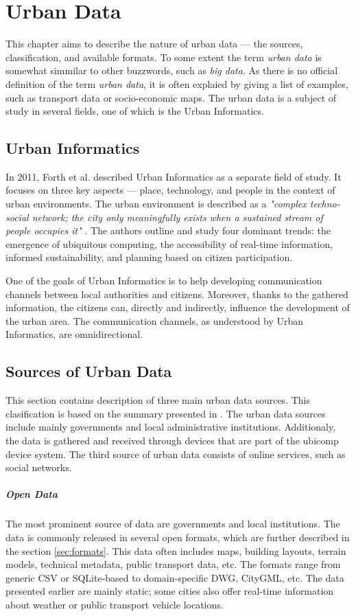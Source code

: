 \chapter{Urban Data}
This chapter aims to describe the nature of urban data --- the sources, classification, and available formats. To some extent the term \textit{urban data} is somewhat simmilar to other buzzwords, such as \textit{big data}. As there is no official definition of the term \textit{urban data}, it is often explaied by giving a list of examples, such as transport data or socio-economic maps. The urban data is a subject of study in several fields, one of which is the Urban Informatics.

\section{Urban Informatics}
In 2011, Forth et al. \cite{foth2011urban} described Urban Informatics as a separate field of study. It focuses on three key aspects --- place, technology, and people in the context of urban environments. The urban environment is described as a \textit{"complex techno-social network; the city only meaningfully exists when a sustained stream of people occupies it"} \cite{foth2011urban}. The authors outline and study four dominant trends: the emergence of ubiquitous computing, the accessibility of real-time information, informed sustainability, and planning based on citizen participation. 

One of the goals of Urban Informatics is to help developing communication channels between local authorities and citizens. Moreover, thanks to the gathered information, the citizens can, directly and indirectly, influence the development of the urban area. The communication channels, as understood by Urban Informatics, are omnidirectional. 

\section{Sources of Urban Data}
This section contains description of three main urban data sources. This clasification is based on the summary presented in \cite{robinson2012street}. The urban data sources include mainly governments and local administrative institutions. Additionaly, the data is gathered and received through devices that are part of the ubicomp device system. The third source of urban data consists of online services, such as social networks. 

\paragraph{Open Data}
The most prominent source of data are governments and local institutions. The data is commonly released in several open formats, which are further described in the section \ref{sec:formats}. This data often includes maps, building layouts, terrain models, technical metadata, public transport data, etc. The formats range from generic CSV or SQLite-based to domain-specific DWG, CityGML, etc.   
The data presented earlier are mainly static; some cities also offer real-time information about weather or public transport vehicle locations. 

